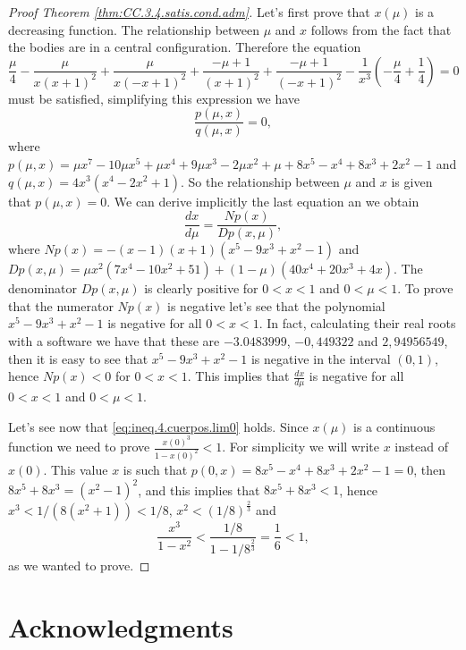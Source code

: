 \documentclass[twoside]{article}
\theoremstyle{remark}
\begin{document}
\begin{proof}[Proof Theorem \ref{thm:CC.3.4.satis.cond.adm}]
Let's first prove that $x(\mu)$ is a decreasing function. The relationship between $\mu$ and $x$ follows from the fact that the bodies are in a central configuration. Therefore the equation 
\[\frac{\mu}{4} - \frac{\mu}{x \left(x + 1\right)^{2}} + \frac{\mu}{x \left(- x + 1\right)^{2}} + \frac{- \mu + 1}{\left(x + 1\right)^{2}} + \frac{- \mu + 1}{\left(- x + 1\right)^{2}} - \frac{1}{x^{3}} \left(- \frac{\mu}{4} + \frac{1}{4}\right) = 0\]
 must be satisfied, simplifying this expression we have 
 \[\frac{p(\mu,x)}{q(\mu,x)}  = 0,\]
 where $p(\mu,x)=\mu x^{7} - 10 \mu x^{5} + \mu x^{4} + 9 \mu x^{3} - 2 \mu x^{2} + \mu + 8 x^{5} - x^{4} + 8 x^{3} + 2 x^{2} - 1$ and $q(\mu,x)=4 x^{3} \left(x^{4} - 2 x^{2} + 1\right)$. So the relationship between $\mu$ and $x$ is given that $p(\mu,x)=0$. We can derive implicitly the last equation an we obtain 
 \[\frac{dx}{d\mu}=\frac{Np(x)}{Dp(x,\mu)},\]
 where $Np(x)=- \left(x - 1\right) \left(x + 1\right) \left(x^{5} - 9 x^{3} + x^{2} - 1\right)$ and  $Dp(x,\mu)=\mu x^2\left(7 x^{4} - 10 x^{2} + 51 \right) +\left(1- \mu \right) \left( 40 x^{4} + 20 x^{3}  + 4 x \right)$. The denominator $Dp(x,\mu)$ is clearly positive for $0<x<1$ and $0<\mu<1$. To prove that the numerator $Np(x)$ is negative let's see that the polynomial $x^{5} - 9 x^{3} + x^{2} - 1$ is negative for all $0 <x <1$. In fact, calculating their real roots with a software we have that these are  $-3.0483999$, $-0,449322$ and $2,94956549$, then it is easy to see that $x^{5} - 9 x^{3} + x^{2} - 1$ is negative in the interval $(0,1)$, hence $Np(x)<0$ for $0<x<1$. This implies that $\frac{dx}{d\mu}$ is negative for all $0<x<1$ and $0<\mu<1$.

Let's see now that \eqref{eq:ineq.4.cuerpos.lim0} holds. Since $x(\mu)$ is a continuous function we need to prove $\frac{x(0)^3}{1-x(0)^2}<1$. For simplicity we will write $x$ instead of $x(0)$. This value $x$ is such that $p(0,x)=8 x^{5} - x^{4} + 8 x^{3} + 2 x^{2} - 1 = 0$,  then  $8 x^{5} + 8 x^{3} = \left(x^{2} - 1\right)^{2}$, and this implies that $8 x^{5} + 8 x^{3}<1$, hence $x^3<1/(8(x^2+1))<1/8$, $x^2<(1/8)^{\frac23}$ and
\[\frac{x^3}{1-x^2}<\frac{1/8}{1-1/8^{\frac23}}=\frac16<1,\]
as we wanted to prove.
\end{proof}







\section*{Acknowledgments}




 
\end{document}
